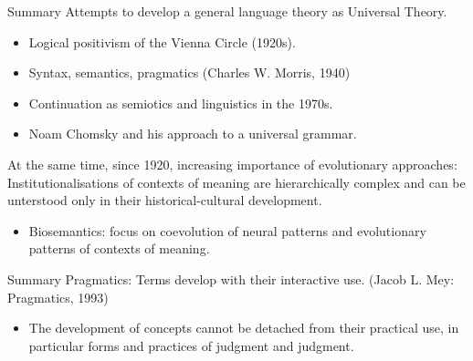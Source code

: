 \documentclass{beamer}
\begin{document}
\begin{frame}{Summary}
Attempts to develop a general language theory as Universal Theory.
\begin{itemize}
\item Logical positivism of the Vienna Circle (1920s).
\item Syntax, semantics, pragmatics (Charles W. Morris, 1940)
\item Continuation as semiotics and linguistics in the 1970s.
\item Noam Chomsky and his approach to a universal grammar.
\end{itemize}
At the same time, since 1920, increasing importance of evolutionary
approaches: Institutionalisations of contexts of meaning are hierarchically
complex and can be unterstood only in their historical-cultural development.
\begin{itemize}
\item Biosemantics: focus on coevolution of neural patterns and evolutionary
  patterns of contexts of meaning.
\end{itemize}
\end{frame}
\begin{frame}{Summary}
Pragmatics: Terms develop with their interactive use.  (Jacob L. Mey:
Pragmatics, 1993)
\begin{itemize}
\item The development of concepts cannot be detached from their practical use,
  in particular forms and practices of judgment and judgment.
\end{itemize}
\end{frame}
\end{document}
